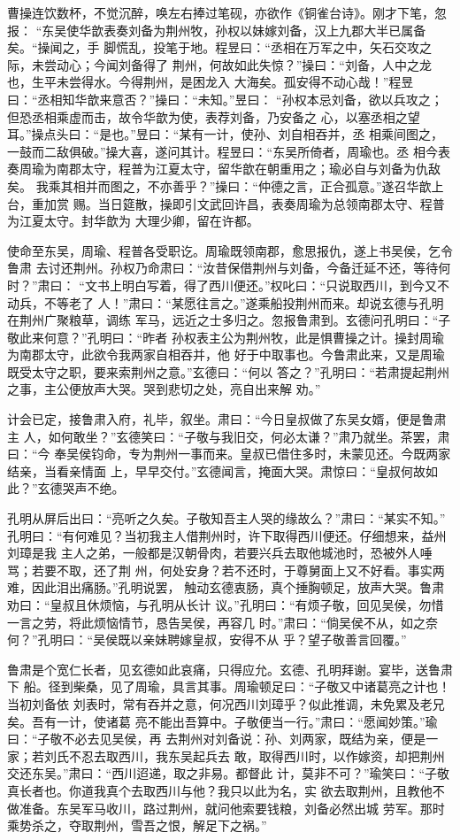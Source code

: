 曹操连饮数杯，不觉沉醉，唤左右捧过笔砚，亦欲作《铜雀台诗》。刚才下笔，忽报：
“东吴使华歆表奏刘备为荆州牧，孙权以妹嫁刘备，汉上九郡大半已属备矣。“操闻之，手
脚慌乱，投笔于地。程昱曰：“丞相在万军之中，矢石交攻之际，未尝动心；今闻刘备得了
荆州，何故如此失惊？”操曰：“刘备，人中之龙也，生平未尝得水。今得荆州，是困龙入
大海矣。孤安得不动心哉！”程昱曰：“丞相知华歆来意否？”操曰：“未知。”昱曰：
“孙权本忌刘备，欲以兵攻之；但恐丞相乘虚而击，故令华歆为使，表荐刘备，乃安备之
心，以塞丞相之望耳。”操点头曰：“是也。”昱曰：“某有一计，使孙、刘自相吞并，丞
相乘间图之，一鼓而二敌俱破。”操大喜，遂问其计。程昱曰：“东吴所倚者，周瑜也。丞
相今表奏周瑜为南郡太守，程普为江夏太守，留华歆在朝重用之；瑜必自与刘备为仇敌矣。
我乘其相并而图之，不亦善乎？”操曰：“仲德之言，正合孤意。”遂召华歆上台，重加赏
赐。当日筵散，操即引文武回许昌，表奏周瑜为总领南郡太守、程普为江夏太守。封华歆为
大理少卿，留在许都。

使命至东吴，周瑜、程普各受职讫。周瑜既领南郡，愈思报仇，遂上书吴侯，乞令鲁肃
去讨还荆州。孙权乃命肃曰：“汝昔保借荆州与刘备，今备迁延不还，等待何时？”肃曰：
“文书上明白写着，得了西川便还。”权叱曰：“只说取西川，到今又不动兵，不等老了
人！”肃曰：“某愿往言之。”遂乘船投荆州而来。却说玄德与孔明在荆州广聚粮草，调练
军马，远近之士多归之。忽报鲁肃到。玄德问孔明曰：“子敬此来何意？”孔明曰：“昨者
孙权表主公为荆州牧，此是惧曹操之计。操封周瑜为南郡太守，此欲令我两家自相吞并，他
好于中取事也。今鲁肃此来，又是周瑜既受太守之职，要来索荆州之意。”玄德曰：“何以
答之？”孔明曰：“若肃提起荆州之事，主公便放声大哭。哭到悲切之处，亮自出来解
劝。”

计会已定，接鲁肃入府，礼毕，叙坐。肃曰：“今日皇叔做了东吴女婿，便是鲁肃主
人，如何敢坐？”玄德笑曰：“子敬与我旧交，何必太谦？”肃乃就坐。茶罢，肃曰：“今
奉吴侯钧命，专为荆州一事而来。皇叔已借住多时，未蒙见还。今既两家结亲，当看亲情面
上，早早交付。”玄德闻言，掩面大哭。肃惊曰：“皇叔何故如此？”玄德哭声不绝。

孔明从屏后出曰：“亮听之久矣。子敬知吾主人哭的缘故么？”肃曰：“某实不知。”
孔明曰：“有何难见？当初我主人借荆州时，许下取得西川便还。仔细想来，益州刘璋是我
主人之弟，一般都是汉朝骨肉，若要兴兵去取他城池时，恐被外人唾骂；若要不取，还了荆
州，何处安身？若不还时，于尊舅面上又不好看。事实两难，因此泪出痛肠。”孔明说罢，
触动玄德衷肠，真个捶胸顿足，放声大哭。鲁肃劝曰：“皇叔且休烦恼，与孔明从长计
议。”孔明曰：“有烦子敬，回见吴侯，勿惜一言之劳，将此烦恼情节，恳告吴侯，再容几
时。”肃曰：“倘吴侯不从，如之奈何？”孔明曰：“吴侯既以亲妹聘嫁皇叔，安得不从
乎？望子敬善言回覆。”

鲁肃是个宽仁长者，见玄德如此哀痛，只得应允。玄德、孔明拜谢。宴毕，送鲁肃下
船。径到柴桑，见了周瑜，具言其事。周瑜顿足曰：“子敬又中诸葛亮之计也！当初刘备依
刘表时，常有吞并之意，何况西川刘璋乎？似此推调，未免累及老兄矣。吾有一计，使诸葛
亮不能出吾算中。子敬便当一行。”肃曰：“愿闻妙策。”瑜曰：“子敬不必去见吴侯，再
去荆州对刘备说：孙、刘两家，既结为亲，便是一家；若刘氏不忍去取西川，我东吴起兵去
敢，取得西川时，以作嫁资，却把荆州交还东吴。”肃曰：“西川迢递，取之非易。都督此
计，莫非不可？”瑜笑曰：“子敬真长者也。你道我真个去取西川与他？我只以此为名，实
欲去取荆州，且教他不做准备。东吴军马收川，路过荆州，就问他索要钱粮，刘备必然出城
劳军。那时乘势杀之，夺取荆州，雪吾之恨，解足下之祸。”

